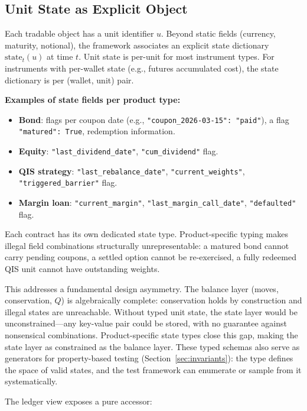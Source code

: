 \documentclass[11pt,a4paper]{article}
\begin{document}
\subsection{Unit State as Explicit Object}

Each tradable object has a unit identifier $u$. Beyond static fields (currency, maturity, notional), the framework associates an explicit state dictionary $\text{state}_t(u)$ at time $t$. Unit state is per-unit for most instrument types. For instruments with per-wallet state (e.g., futures accumulated cost), the state dictionary is per (wallet, unit) pair.

\noindent\textbf{Examples of state fields per product type:}

\begin{itemize}
\item \textbf{Bond}: flags per coupon date (e.g., \texttt{"coupon\_2026-03-15":\ "paid"}), a flag \texttt{"matured": True}, redemption information.
\item \textbf{Equity}: \texttt{"last\_dividend\_date"}, \texttt{"cum\_dividend"} flag.
\item \textbf{QIS strategy}: \texttt{"last\_rebalance\_date"}, \texttt{"current\_weights"}, \texttt{"triggered\_barrier"} flag.
\item \textbf{Margin loan}: \texttt{"current\_margin"}, \texttt{"last\_margin\_call\_date"}, \texttt{"defaulted"} flag.
\end{itemize}

Each contract has its own dedicated state type. Product-specific typing makes illegal field combinations structurally unrepresentable: a matured bond cannot carry pending coupons, a settled option cannot be re-exercised, a fully redeemed QIS unit cannot have outstanding weights.

This addresses a fundamental design asymmetry. The balance layer (moves, conservation, $Q$) is algebraically complete: conservation holds by construction and illegal states are unreachable. Without typed unit state, the state layer would be unconstrained---any key-value pair could be stored, with no guarantee against nonsensical combinations. Product-specific state types close this gap, making the state layer as constrained as the balance layer. These typed schemas also serve as generators for property-based testing (Section~\ref{sec:invariants}): the type defines the space of valid states, and the test framework can enumerate or sample from it systematically.

The ledger view exposes a pure accessor:
\end{document}
